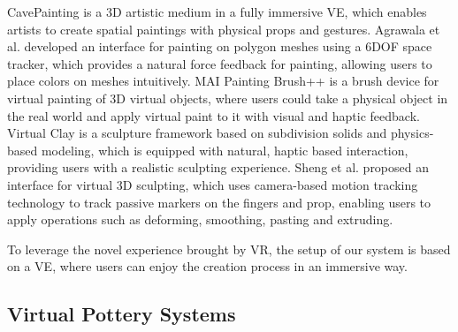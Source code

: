 \documentclass{svjour3}                     %
\begin{document}
CavePainting \cite{keefe2001cavepainting} is a 3D artistic medium in a fully immersive VE, which enables artists to create spatial paintings with physical props and gestures. Agrawala et al. \cite{agrawala19953d} developed an interface for painting on polygon meshes using a 6DOF space tracker, which provides a natural force feedback for painting, allowing users to place colors on meshes intuitively. MAI Painting Brush++ \cite{otsuki2017brush} is a brush device for virtual painting of 3D virtual objects, where users could take a physical object in the real world and apply virtual paint to it with visual and haptic feedback.
Virtual Clay \cite{mcdonnell2001virtual} is a sculpture framework based on subdivision solids and physics-based modeling, which is equipped with natural, haptic based interaction, providing users with a realistic sculpting experience. Sheng et al. \cite{sheng2006interface} proposed an interface for virtual 3D sculpting, which uses camera-based motion tracking technology to track passive markers on the fingers and prop, enabling users to apply operations such as deforming, smoothing, pasting and extruding.

To leverage the novel experience brought by VR, the setup of our system is based on a VE, where users can enjoy the creation process in an immersive way.

\subsection{Virtual Pottery Systems}
\label{sec:virtual}

\end{document}
